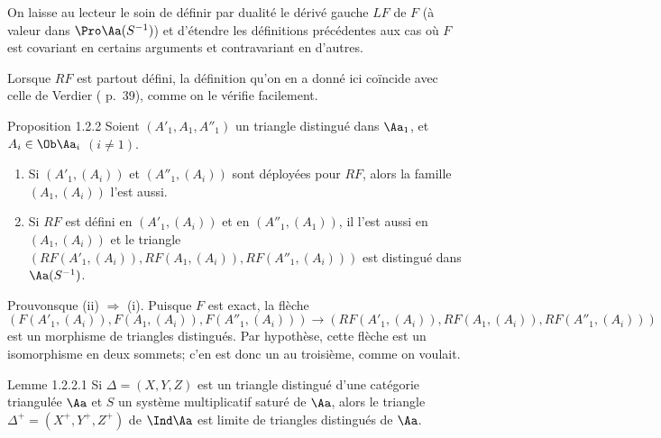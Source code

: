 \documentclass[10pt]{../fichiers-configuration-latex/smfart}
\begin{document}
On laisse au lecteur le soin de définir par dualité le dérivé gauche
$LF$ de $F$ (à valeur dans $\Pro \Aa(S^{-1})$) et d'étendre
les définitions précédentes aux cas où $F$ est covariant en certains
arguments et contravariant en d'autres.

Lorsque $RF$ est partout défini, la définition qu'on en a donné ici
coïncide avec celle de Verdier (\cite{SGA4-17:CD} p.~39), comme on le vérifie
facilement.

\begin{enonce*}{Proposition 1.2.2}
Soient $(A'_1, A_1,A''_1)$ un triangle distingué dans $\Aa_1$,
et\break $A_i\in \Ob \Aa_i$ $(i\neq 1)$.
\begin{enumerate}
\renewcommand{\theenumi}{\roman{enumi}}
\renewcommand{\labelenumi}{(\theenumi)}
\item Si $(A'_{1},(A_{i}))$ et $(A''_{1},(A_{i}))$ sont déployées pour
  $RF$, alors la famille $(A_{1},(A_{i}))$ l'est aussi.

\item Si $RF$ est défini en $(A'_1, (A_i))$ et en $(A''_1, (A_1))$, il
l'est aussi en $(A_1, (A_i))$ et le triangle $(RF(A'_1,(A_i)),
RF(A_1,(A_i)),RF(A''_1,(A_i)))$ est distingué dans
$\Aa(S^{-1})$.
\end{enumerate}
\end{enonce*}

Prouvons\pageoriginale que (ii) $\Rightarrow$ (i). Puisque $F$ est exact,
la flèche $$(F(A'_1,(A_i)), F(A_1,(A_i)), F(A''_1,(A_i)))\rightarrow
(RF(A'_1,(A_i)), RF(A_1,(A_i)), RF(A''_1,(A_i)))$$ est un morphisme de
triangles distingués. Par hypothèse, cette flèche est un isomorphisme
en deux sommets; c'en est donc un au troisième, comme on voulait.

\begin{enonce*}{Lemme 1.2.2.1}
Si $\Delta=(X,Y,Z)$ est un triangle distingué d'une catégorie triangulée
$\Aa$ et $S$ un système multiplicatif saturé de $\Aa$,
alors le triangle $\Delta^{+}=(X^{+},Y^{+},Z^{+})$ de
$\Ind\Aa$ est limite de triangles distingués de $\Aa$.
\end{enonce*}
\end{document}
